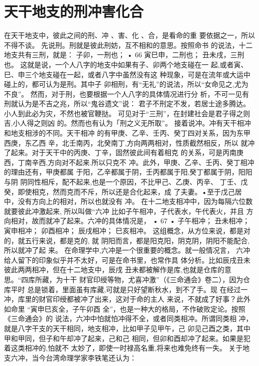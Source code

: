 \section{天干地支的刑冲害化合}

在天干地支中，彼此之间的刑、冲 、害、化 、合，是看命的重
要依据之一，所以不得不谈。
先说刑。刑就是彼此刑妨，互不相和的意思。按照命书
的说法，十二地支共有三刑，就是：
子卯，一刑也；
• 66
寅巳申，二刑也；
丑未戌，三刑也。
这就是说，一个人八字的地支中如果有子、卯两个地支碰在一
起,或者寅、巳、申三个地支碰在一起，或者八字中虽然没有这
种现象，可是在流年或大运中碰上的，都可认为是刑。其中子
卯相刑，有“无礼”的说法，所以“女命见之,尤为不良”。
然而，对于刑，也要根据一个人八字的具体情况进行分
析，不可一见有刑就认为是不吉之兆，所以“鬼谷遗文”说：
君子不刑定不发，若居士途多腾达。
小人到此必为灾，不然也被官鞭挞。
可见对于“三刑”，在封建社会是君子得之则吉,小人得之则凶
的。然而也有认为「刑之义无所取”。
接着说冲。冲有天干相冲和地支相涉的不同。天干相冲
的有甲庚、乙辛、壬丙、癸丁四对关系，因为东甲西庚，东乙西
辛，北壬南丙，北癸南丁,方向两两相对，性质截然相反，所以
就冲了起来。对于天干中的丙庚、丁辛，固然彼此间有着相克
的关系，可是丙南庚西，丁南辛西,方向对不起来.所以只克不
冲。此外，甲庚、乙辛、壬丙、癸丁相冲的理由还有，甲庚都属
于阳，乙辛都属于阴，壬丙都属于阳,癸丁都属于阴，阳阳与阴
阴同性相斥，配不起来,也是一个原因，不比甲己、乙庚、丙辛、
丁壬、戊癸，即使相克，然而克而不斥，所以还是合化起来，成
了夫妻。•至于戊己居中，没有方向上的相对，所以也就没有
冲。
在十二地支相冲中，因为每隔六位数就要彼此冲激起来,
所以叫做“六冲 比如子午相冲，子代表水，午代表火，并且
方向相对，故而就冲了起来。六冲的具体情况是，
• 67 •
子午相冲；
丑未相冲；
寅申相冲；
卯酉相冲；
辰戌相冲；
巳亥相冲。
这组概念，从方位来说，都是对的，就五行来说，都是克的, 就
阴阳而言，都是阳克阳，阴克阴，阴阳不能配合,所以就冲了起
来。
在命理学中,六冲是一个很重要的概念。就一般情况言，
六冲给人留下的印象似乎并不太好，可是在命书里，也常作具
体分析。比如辰戌丑未彼此两两相冲，但在十二地支中，辰戌
丑未都被解作是库,也就是仓库的意思。“四库所藏，为十干
财官印绶等物，尤喜冲激”（《三命通会》卷二），因为仓库平时
总是锁着，里面虽有库藏,可就是只好望断秋水，到不了手。现
在经过一冲，库里的财官印绶都被冲了出来，这对于命的主人
来说，不就成了好事？此外如命里 “寅申巳亥全，子午卯酉
全”，也是一种大的格局，不作破败定论。按照《三命通会》的
说法，六冲中怕就怕冲得不全，或者同类相冲。所谓同类相
冲，就是八字干支的天干相同，地支相冲，比如甲子见甲午，己
卯见己酉之类，其中甲和甲同，但子和午却冲了起来，己和己
相同，但卯和酉却冲了起来。如果是犯着这类相冲的,怕就不
太妙了，即使一时禄高名重,将来也难免终有一失。
关于地支六冲，当今台湾命理学家李铁笔还认为：
